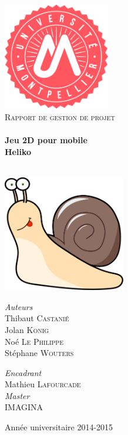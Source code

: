 \begin{titlepage}
\begin{center}

\includegraphics[width=0.35\textwidth]{./img/logoUM}~\\[1cm]

\textsc{\LARGE Rapport de gestion de projet}\\[0.5cm]

\HRule \\[0.4cm]

{\huge \bfseries Jeu 2D pour mobile\\
Heliko \\[0.4cm] }

\HRule \\[1.5cm]


\includegraphics[width=0.4\textwidth]{./img/logo}~\\[1.5cm]

\begin{minipage}{0.4\textwidth}
\begin{flushleft} \large
\emph{Auteurs}\\
Thibaut \textsc{Castanié}\\
Jolan \textsc{Konig}\\
Noé \textsc{Le Philippe}\\
Stéphane \textsc{Wouters}
\end{flushleft}
\end{minipage}
\begin{minipage}{0.4\textwidth}
\begin{flushright} \large
\emph{Encadrant} \\
Mathieu \textsc{Lafourcade}\\
\emph{Master} \\
\textsc{IMAGINA}
\end{flushright}
\end{minipage}

\vfill

{\large Année universitaire 2014-2015}

\end{center}
\end{titlepage}
